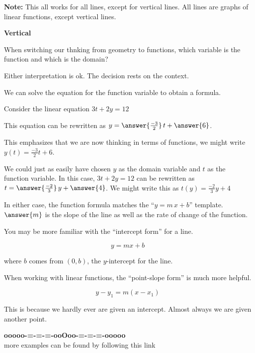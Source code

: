 \documentclass{ximera}
\begin{document}
\textbf{Note:} This all works for all lines, except for vertical lines. All lines are graphs of linear functions, except vertical lines. 



\begin{explanation} \textbf{\textcolor{red!75!green}{Vertical}}


When switching our thnking from geometry to functions, which variable is the function and which is the domain? 

Either interpretation is ok.  The decision rests on the context.  

We can solve the equation for the function variable to obtain a formula.



Consider the linear equation $3 t + 2 y = 12$ 

This equation can be rewritten as $y = \answer{\frac{-3}{2}} \, t + \answer{6}$.

This emphasizes that we are now thinking in terms of functions, we might write $y(t) = \tfrac{-3}{2} t + 6$.




We could just as easily have chosen $y$ as the domain variable and $t$ as the function variable.  In this case, $3 t + 2 y = 12$ can be rewritten as $t = \answer{\frac{-2}{3}} \, y + \answer{4}$.  We might write this as $t(y) = \tfrac{-2}{3} y + 4$




In either case, the function formula matches the ``$y = m \, x + b$'' template.  $\answer{m}$ is the slope of the line as well as the rate of change of the function.


\end{explanation}



You may be more familiar with the ``intercept form'' for a line.

\[ y = m x + b\]

where $b$ comes from $(0,b)$, the $y$-intercept for the line.


When working with linear functions, the ``point-slope form'' is much more helpful.

\[ y - y_1 = m (x - x_1)\]


This is because we hardly ever are given an intercept. Almost always we are given another point.
















\begin{center}
\textbf{\textcolor{green!50!black}{ooooo-=-=-=-ooOoo-=-=-=-ooooo}} \\

more examples can be found by following this link\\ 

\end{center}
\end{document}
